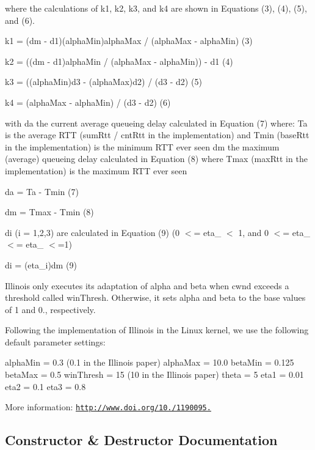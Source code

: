 where the calculations of k1, k2, k3, and k4 are shown in Equations (3), (4), (5), and (6). \begin{DoxyVerb}     k1 = (dm - d1)(alphaMin)alphaMax / (alphaMax - alphaMin)    (3)

     k2 = ((dm - d1)alphaMin / (alphaMax - alphaMin)) - d1       (4)

     k3 = ((alphaMin)d3 - (alphaMax)d2) / (d3 - d2)              (5)

     k4 = (alphaMax - alphaMin) / (d3 - d2)                      (6)
\end{DoxyVerb}


with da the current average queueing delay calculated in Equation (7) where\+: Ta is the average R\+TT (sum\+Rtt / cnt\+Rtt in the implementation) and Tmin (base\+Rtt in the implementation) is the minimum R\+TT ever seen dm the maximum (average) queueing delay calculated in Equation (8) where Tmax (max\+Rtt in the implementation) is the maximum R\+TT ever seen \begin{DoxyVerb}     da = Ta - Tmin          (7)

     dm = Tmax - Tmin         (8)
\end{DoxyVerb}


di (i = 1,2,3) are calculated in Equation (9) (0 $<$= eta\+\_ $<$ 1, and 0 $<$= eta\+\_ $<$= eta\+\_ $<$=1) \begin{DoxyVerb}      di = (eta_i)dm            (9)
\end{DoxyVerb}


Illinois only executes its adaptation of alpha and beta when cwnd exceeds a threshold called win\+Thresh. Otherwise, it sets alpha and beta to the base values of 1 and 0., respectively.

Following the implementation of Illinois in the Linux kernel, we use the following default parameter settings\+: \begin{DoxyVerb}  alphaMin = 0.3      (0.1 in the Illinois paper)
  alphaMax = 10.0
  betaMin = 0.125
  betaMax = 0.5
  winThresh = 15      (10 in the Illinois paper)
  theta = 5
  eta1 = 0.01
  eta2 = 0.1
  eta3 = 0.8
\end{DoxyVerb}


More information\+: \href{http://www.doi.org/10.1145/1190095.1190166}{\tt http\+://www.\+doi.\+org/10./1190095.} 

\subsection{Constructor \& Destructor Documentation}
